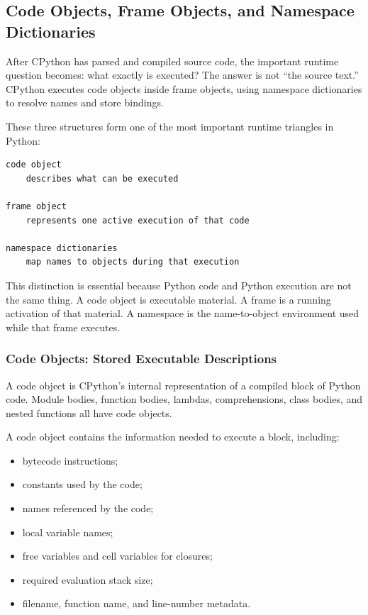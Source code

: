 \subsection{Code Objects, Frame Objects, and Namespace Dictionaries}

After CPython has parsed and compiled source code, the important runtime question becomes: what exactly is executed? The answer is not “the source text.” CPython executes code objects inside frame objects, using namespace dictionaries to resolve names and store bindings.

These three structures form one of the most important runtime triangles in Python:

\begin{verbatim}
code object
    describes what can be executed

frame object
    represents one active execution of that code

namespace dictionaries
    map names to objects during that execution
\end{verbatim}

This distinction is essential because Python code and Python execution are not the same thing. A code object is executable material. A frame is a running activation of that material. A namespace is the name-to-object environment used while that frame executes.

\subsubsection{Code Objects: Stored Executable Descriptions}

A code object is CPython's internal representation of a compiled block of Python code. Module bodies, function bodies, lambdas, comprehensions, class bodies, and nested functions all have code objects.

A code object contains the information needed to execute a block, including:

\begin{itemize}
    \item bytecode instructions;
    \item constants used by the code;
    \item names referenced by the code;
    \item local variable names;
    \item free variables and cell variables for closures;
    \item required evaluation stack size;
    \item filename, function name, and line-number metadata.
\end{itemize}

